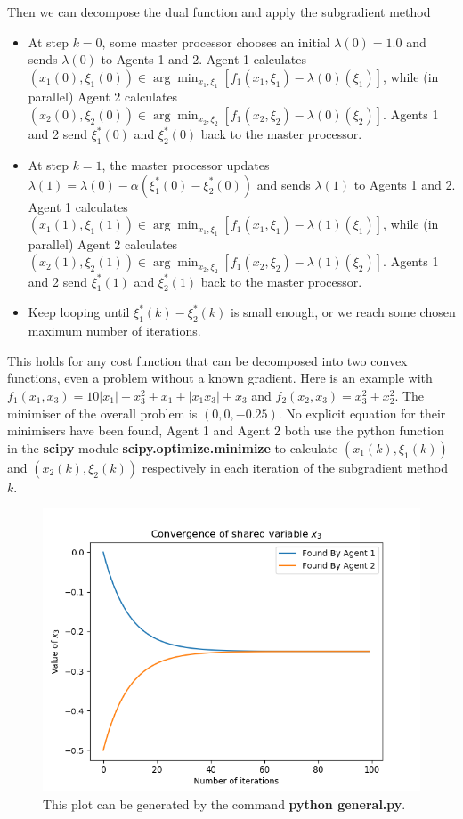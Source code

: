 \documentclass[12pt]{article}
\begin{document}
Then we can decompose the dual function and apply the subgradient method
\begin{itemize}
	\item At step $k=0$, some master processor chooses an initial $\lambda(0)=1.0$ and sends $\lambda(0)$ to Agents 1 and 2. Agent 1 calculates $(x_1(0),\xi_1(0))\in\arg\min_{x_1,\xi_1}[f_1(x_1,\xi_1)-\lambda(0)(\xi_1)]$, while (in parallel) Agent 2 calculates $(x_2(0),\xi_2(0))\in\arg\min_{x_2,\xi_2}[f_1(x_2,\xi_2)-\lambda(0)(\xi_2)]$. Agents 1 and 2 send $\xi_1^*(0)$ and $\xi_2^*(0)$ back to the master processor.
	\item At step $k=1$, the master processor updates $\lambda(1)=\lambda(0)-\alpha(\xi_1^*(0)-\xi_2^*(0))$ and sends $\lambda(1)$ to Agents 1 and 2. Agent 1 calculates $(x_1(1),\xi_1(1))\in\arg\min_{x_1,\xi_1}[f_1(x_1,\xi_1)-\lambda(1)(\xi_1)]$, while (in parallel) Agent 2 calculates $(x_2(1),\xi_2(1))\in\arg\min_{x_2,\xi_2}[f_1(x_2,\xi_2)-\lambda(1)(\xi_2)]$. Agents 1 and 2 send $\xi_1^*(1)$ and $\xi_2^*(1)$ back to the master processor.
	\item Keep looping until $\xi_1^*(k)-\xi_2^*(k)$ is small enough, or we reach some chosen maximum number of iterations.
\end{itemize}

This holds for any cost function that can be decomposed into two convex functions, even a problem without a known gradient. Here is an example with $f_1(x_1,x_3)=10|x_1|+x_3^2+x_1+|x_1x_3|+x_3$ and $f_2(x_2,x_3)=x_3^2 + x_2^2$. The minimiser of the overall problem is $(0,0,-0.25)$. No explicit equation for their minimisers have been found, Agent 1 and Agent 2 both use the python function in the \textbf{scipy} module \textbf{scipy.optimize.minimize} to calculate $(x_1(k),\xi_1(k))$ and $(x_2(k),\xi_2(k))$ respectively in each iteration of the subgradient method $k$.

\begin{figure}[H]
	\centering
	\includegraphics[scale=0.5]{Problem1-General.png}
	\caption{This plot can be generated by the command \textbf{python general.py}.}
\end{figure}
\end{document}
